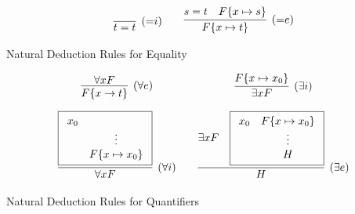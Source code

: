
\begin{table}[hbt]
	\begin{gather*}
	\infer[({=}i)]{t=t}{}
	\qquad
	\infer[({=}e)]{F\{x\mapsto t\}}{s=t & F\{x\mapsto s\}}
	\end{gather*}
	\caption{Natural Deduction Rules for Equality}
	\label{tab:natural:deduction:equality}
\end{table}

\begin{table}[hbt]
	\begin{gather*}
	\begin{array}{ccc}
	\infer[(\forall e)]{F\{x\to t\}}{
		\forall x F
	}
	&&
		\infer[(\exists i)]{\exists x F}{
		F\{x\mapsto x_0 \}
	}
	\\[1em]
	\infer[(\forall i)]{\forall x F}{
		\boxed{\begin{array}{cc}x_0\\&\vdots\\&F\{x\mapsto x_0\}\end{array}}
	}
	&&
	\infer[(\exists e)]{H}{
		\exists x F &
		\boxed{\begin{array}{cc}x_0&F\{x\mapsto x_0 \}\\&\vdots\\&H\end{array}}
	}
	\end{array}
	\end{gather*}
	\caption{Natural Deduction Rules for Quantifiers}
	\label{tab:natural:deduction:quantifiers}
\end{table}